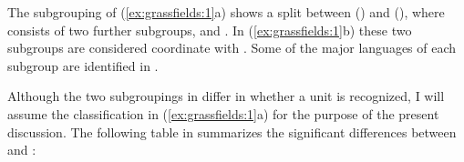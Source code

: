 \documentclass[output=paper]{langsci/langscibook}
\begin{document}
The subgrouping of (\ref{ex:grassfields:1}a) shows a split between  () and  (), where  consists of two further subgroups,  and . In (\ref{ex:grassfields:1}b) these two subgroups are considered coordinate with . Some of the major languages of each subgroup are identified in .

\ea%
\label{ex:grassfields:2} 
  \begin{xlist}
  \medskip
  \medskip
  \end{xlist}
\z

 
Although the two subgroupings in  differ in whether a  unit is recognized, I will assume the classification in (\ref{ex:grassfields:1}a) for the purpose of the present discussion. The following table in  summarizes the significant differences between  and  \citep[55]{Stallcup1980geo}:


\ea
    \label{ex:grassfields:3}
\end{document}
